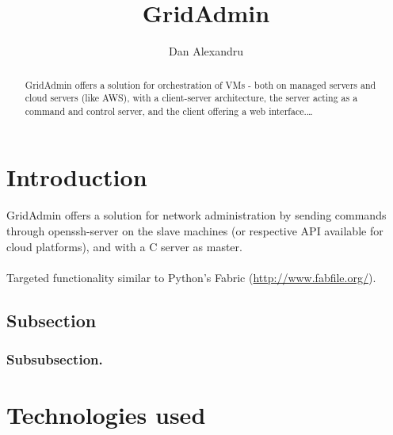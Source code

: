 \documentclass{llncs}
\begin{document}
\title{GridAdmin}
%
\author{Dan Alexandru}
%
%
%

\maketitle              %
%


%
\begin{abstract}
GridAdmin offers a solution for orchestration of VMs - both on managed servers and cloud servers (like AWS), with a client-server architecture, the server acting as a command and control server, and the client offering a web interface.\dots
{}
\end{abstract}
%

\section{Introduction}
%
GridAdmin offers a solution for network administration by sending commands through openssh-server on the slave machines (or respective API available for cloud platforms), and with a C server as master.
\\\\
Targeted functionality similar to Python's Fabric (\url{http://www.fabfile.org/}).
%
\subsection{Subsection}
%

%
\subsubsection{Subsubsection.}
%

%
\section{Technologies used}
%
\end{document}
